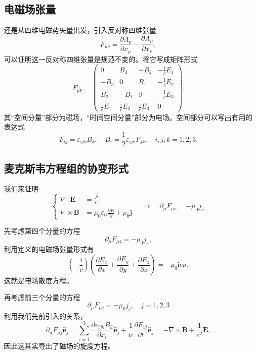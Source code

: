 \documentclass[UTF8]{ctexbook}
\renewcommand{\b}{\boldsymbol}
\renewcommand{\i}{\mathrm{i}}
\numberwithin{equation}{chapter}
\begin{document}
	\subsection{电磁场张量}
	还是从四维电磁势矢量出发，引入反对称四维张量
	\[F_{\mu\nu}=\frac{\partial A_\nu}{\partial x_\mu}-\frac{\partial A_\mu}{\partial x_\nu},\]
	可以证明这一反对称四维张量是规范不变的。将它写成矩阵形式
	\[F_{\mu\nu}=\begin{pmatrix}
		0 & B_3 & -B_2 & -\frac{\i}{c}E_1 \\ 
		-B_3 & 0 & B_1 & -\frac{\i}{c}E_2 \\
		B_2 & -B_1 & 0 & -\frac{\i}{c}E_3 \\
		\frac{\i}{c}E_1 & \frac{\i}{c}E_2 & \frac{\i}{c}E_3 & 0
	\end{pmatrix}.\]
	其“空间分量”部分为磁场，“时间空间分量”部分为电场。空间部分可以写出有用的表达式
	\[F_{ij}=\varepsilon_{ijk}B_k,\quad B_i=\frac{1}{2}\varepsilon_{ijk}F_{jk},\quad i,j,k=1,2,3.\]
	
	\subsection{麦克斯韦方程组的协变形式}
	我们来证明
	\[\left\{\begin{aligned}
		\nabla\cdot\b{E}&=\frac{\rho}{\varepsilon_0} \\
		\nabla\times\b{B}&=\mu_0\varepsilon_0\frac{\partial \b{E}}{\partial t}+\mu_0\b{j}
	\end{aligned}\right. \quad \Rightarrow \quad\partial_\mu F_{\mu\nu}=-\mu_0j_\nu.\]

	先考虑第四个分量的方程
	\[\partial_\mu F_{\mu 4}=-\mu_0j_4,\]
	利用定义的电磁场张量形式有
	\[\left(-\frac{\i }{c}\right)\left(\frac{\partial E_x}{\partial x}+\frac{\partial E_y}{\partial y}+\frac{\partial E_z}{\partial z}\right)=-\mu_0\i c\rho,\]
	这就是电场散度方程。
	
	再考虑前三个分量的方程
	\[\partial_\mu F_{\mu j}=-\mu_0j_j,\quad j=1,2,3\]
	\[\]
	利用我们先前引入的关系，
	\[\partial_{\mu}F_{\mu j}\hat{\b{e}}_j=\sum_{i=1}^{3}\frac{\partial \varepsilon_{ijk}B_k}{\partial x_i}\hat{\b{e}}_j+\frac{1}{\i c}\frac{\partial F_{4 j}}{\partial t}\hat{\b{e}}_j=-\nabla\times\b{B}+\frac{1}{c^2}\b{E},\]
	因此这其实导出了磁场的旋度方程。
	
\end{document}
